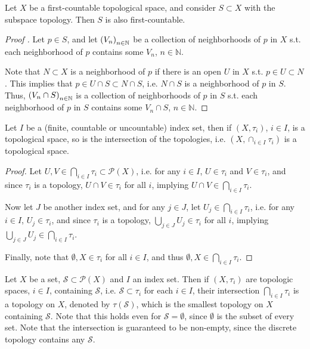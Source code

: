 \begin{theorem}
	Let $X$ be a first-countable topological space, and consider $S \subset X$ with the subspace topology. Then $S$ is also first-countable.
\end{theorem}

\begin{proof}[Proof \cite{4548419}]
	Let $p\in S$, and let $\seq[V_n]$ be a collection of neighborhoods of $p$ in $X$ s.t. each neighborhood of $p$ contains some $V_n$, $n\in\mathbb N$.
	
	Note that $N\subset X$ is a neighborhood of $p$ if there is an open $U$ in $X$ s.t. $p\in U\subset N$. This implies that $p\in U\cap S\subset N\cap S$, i.e. $N\cap S$ is a neighborhood of $p$ in $S$. Thus, $\seq[V_n\cap S]$ is a collection of neighborhoods of $p$ in $S$ s.t. each neighborhood of $p$ in $S$ contains some $V_n\cap S$, $n\in\mathbb N$.
\end{proof}

\begin{theorem}\label{thrm:arbitrary_intersec_tops_top}
	Let $I$ be a (finite, countable or uncountable) index set, then if $(X, \tau_i)$, $i\in I$, is a topological space, so is the intersection of the topologies, i.e. $\left(X, \cap_{i\in I}\tau_i\right)$ is a topological space.
\end{theorem}

\begin{proof}
	Let $U, V\in \bigcap_{i\in I}\tau_i \subset \mathcal P(X)$, i.e. for any $i\in I$, $U\in\tau_i$ and $V\in \tau_i$, and since $\tau_i$ is a topology, $U\cap V\in\tau_i$ for all $i$, implying $U\cap V\in\bigcap_{i\in I}\tau_i$.
	
	Now let $J$ be another index set, and for any $j\in J$, let $U_j\in \bigcap_{i\in I}\tau_i$, i.e. for any $i\in I$, $U_j\in \tau_i$, and since $\tau_i$ is a topology, $\bigcup_{j\in J}U_j\in \tau_i$ for all $i$, implying $\bigcup_{j\in J}U_j\in \bigcap_{i\in I}\tau_i$.
	
	Finally, note that $\emptyset, X\in \tau_i$ for all $i\in I$, and thus $\emptyset, X\in \bigcap_{i\in I}\tau_i$.
\end{proof}

\begin{corollary}\label{corollary:intersection_topology_containing_subset}
	Let $X$ be a set, $\mathscr S\subset \mathscr P(X)$ and $I$ an index set. Then if $(X, \tau_i)$ are topologic spaces, $i\in I$, containing $\mathscr S$, i.e. $\mathscr S\subset \tau_i$ for each $i\in I$, their intersection $\bigcap_{i\in I}\tau_i$ is a topology on $X$, denoted by $\tau(\mathscr S)$, which is the smallest topology on $X$ containing $\mathscr S$. Note that this holds even for $\mathscr S = \emptyset$, since $\emptyset$ is the subset of every set. Note that the intersection is guaranteed to be non-empty, since the discrete topology contains any $\mathscr S$. 
\end{corollary}


